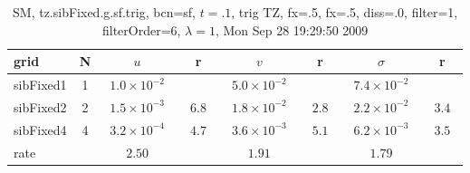 \begin{table}[hbt]\tableFont %
\begin{center}
\begin{tabular}{|l|c|c|c|c|c|c|c|} \hline 
grid  & N &  $u$  & r &  $v$  & r &  $\sigma$   & r \\ \hline 
           sibFixed1 &     1 & ~$1.0\times10^{ -2}$~ &           & ~$5.0\times10^{ -2}$~ &           & ~$7.4\times10^{ -2}$~ &            \\ \hline
           sibFixed2 &     2 & ~$1.5\times10^{ -3}$~ & ~$  6.8$~ & ~$1.8\times10^{ -2}$~ & ~$  2.8$~ & ~$2.2\times10^{ -2}$~ & ~$  3.4$~  \\ \hline
           sibFixed4 &     4 & ~$3.2\times10^{ -4}$~ & ~$  4.7$~ & ~$3.6\times10^{ -3}$~ & ~$  5.1$~ & ~$6.2\times10^{ -3}$~ & ~$  3.5$~  \\ \hline
    rate             &       &       $2.50$         &       &       $1.91$         &       &       $1.79$         &        \\ \hline
\end{tabular}
\caption{SM, tz.sibFixed.g.sf.trig, bcn=sf, $t=.1$, trig TZ, fx=.5, fx=.5, diss=.0, filter=1, filterOrder=6, $\lambda=1$, Mon Sep 28 19:29:50 2009}\label{table:tz.sibFixed.g.sf.trig}
\end{center}
\end{table}
